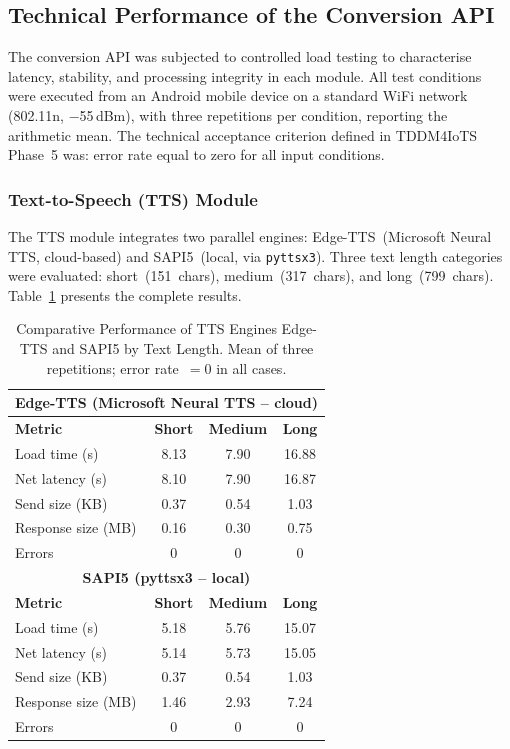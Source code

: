 \documentclass[journal]{IEEEtran}
\begin{document}
	\subsection{Technical Performance of the Conversion API}
	The conversion API was subjected to controlled load testing to
	characterise latency, stability, and processing integrity in each
	module.
	All test conditions were executed from an Android mobile device
	on a standard WiFi network (802.11n, $-$55\,dBm), with three
	repetitions per condition, reporting the arithmetic mean.
	The technical acceptance criterion defined in TDDM4IoTS
	Phase~5 was: error rate equal to zero for all input conditions.
	
	\subsubsection{Text-to-Speech (TTS) Module}
	The TTS module integrates two parallel engines: Edge-TTS~(Microsoft
	Neural TTS, cloud-based) and SAPI5~(local, via \texttt{pyttsx3}).
	Three text length categories were evaluated: short~(151~chars),
	medium~(317~chars), and long~(799~chars).
	Table~\ref{tab:tts} presents the complete results.
	
	\begin{table}[!t]
		\caption{Comparative Performance of TTS Engines Edge-TTS and SAPI5
			by Text Length. Mean of three repetitions; error rate~$=0$ in all cases.}
		\label{tab:tts}
		\centering
		\scriptsize
		\renewcommand{\arraystretch}{1.25}
		\begin{tabular}{lccc}
			\toprule
			\multicolumn{4}{c}{\textbf{Edge-TTS (Microsoft Neural TTS -- cloud)}} \\
			\midrule
			\textbf{Metric} & \textbf{Short} & \textbf{Medium} & \textbf{Long} \\
			\midrule
			Load time (s)          & 8.13  & 7.90  & 16.88 \\
			Net latency (s)        & 8.10  & 7.90  & 16.87 \\
			Send size (KB)         & 0.37  & 0.54  & 1.03  \\
			Response size (MB)     & 0.16  & 0.30  & 0.75  \\
			Errors                 & 0     & 0     & 0     \\
			\midrule
			\multicolumn{4}{c}{\textbf{SAPI5 (pyttsx3 -- local)}} \\
			\midrule
			\textbf{Metric} & \textbf{Short} & \textbf{Medium} & \textbf{Long} \\
			\midrule
			Load time (s)          & 5.18  & 5.76  & 15.07 \\
			Net latency (s)        & 5.14  & 5.73  & 15.05 \\
			Send size (KB)         & 0.37  & 0.54  & 1.03  \\
			Response size (MB)     & 1.46  & 2.93  & 7.24  \\
			Errors                 & 0     & 0     & 0     \\
			\bottomrule
		\end{tabular}
	\end{table}
	
\end{document}
